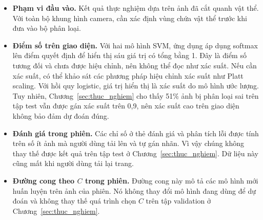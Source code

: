 \begin{itemize}
  \item \textbf{Phạm vi đầu vào.} Kết quả thực nghiệm dựa trên ảnh đã cắt quanh vật thể. Với toàn bộ khung hình camera, cần xác định vùng chứa vật thể trước khi đưa vào bộ phân loại.
  \item \textbf{Điểm số trên giao diện.} Với hai mô hình SVM, ứng dụng áp dụng softmax lên điểm quyết định để hiển thị sáu giá trị có tổng bằng 1. Đây là điểm số tương đối và chưa được hiệu chỉnh, nên không thể đọc như xác suất. Nếu cần xác suất, có thể khảo sát các phương pháp hiệu chỉnh xác suất như Platt scaling. Với hồi quy logistic, giá trị hiển thị là xác suất do mô hình ước lượng. Tuy nhiên, Chương~\ref{sec:thuc_nghiem} cho thấy 51\% ảnh bị phân loại sai trên tập test vẫn được gán xác suất trên 0,9, nên xác suất cao trên giao diện không bảo đảm dự đoán đúng.
  \item \textbf{Đánh giá trong phiên.} Các chỉ số ở thẻ đánh giá và phân tích lỗi được tính trên số ít ảnh mà người dùng tải lên và tự gán nhãn. Vì vậy chúng không thay thế được kết quả trên tập test ở Chương~\ref{sec:thuc_nghiem}. Dữ liệu này cũng mất khi người dùng tải lại trang.
  \item \textbf{Đường cong theo $C$ trong phiên.} Đường cong này mô tả các mô hình mới huấn luyện trên ảnh của phiên. Nó không thay đổi mô hình đang dùng để dự đoán và không thay thế quá trình chọn $C$ trên tập validation ở Chương~\ref{sec:thuc_nghiem}.
\end{itemize}
